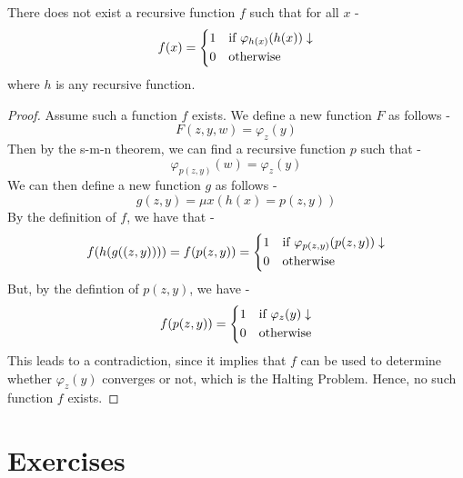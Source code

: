 \documentclass[openany]{book}
\begin{document}
\begin{mytheorem}
    There does not exist a recursive function $f$ such that for all $x$ - 
    $$f(x) = \begin{dcases}
        1 & \text{if } \varphi_{h(x)}(h(x)) \downarrow \\
        0 & \text{otherwise}
        \end{dcases}$$
    where $h$ is any recursive function.
\end{mytheorem}
\begin{proof}
    Assume such a function $f$ exists. We define a new function $F$ as follows - 
    $$F(z, y, w) = \varphi_z(y)$$
    Then by the s-m-n theorem, we can find a recursive function $p$ such that -
    $$\varphi_{p(z, y)}(w) = \varphi_z(y)$$
     We can then define a new function $g$ as follows - 
    $$g(z, y) = \mu x(h(x) = p(z, y))$$
    By the definition of $f$, we have that -
    $$f(h(g((z, y)))) = f(p(z, y)) = \begin{dcases}
        1 & \text{if } \varphi_{p(z, y)}(p(z, y)) \downarrow \\
        0 & \text{otherwise}
        \end{dcases}$$
    But, by the defintion of $p(z, y)$, we have - 
    $$f(p(z, y)) = \begin{dcases}
        1 & \text{if } \varphi_z(y) \downarrow \\
        0 & \text{otherwise}
        \end{dcases}$$
    This leads to a contradiction, since it implies that $f$ can be used to determine whether $\varphi_z(y)$ converges or not, which is the Halting Problem. Hence, no such function $f$ exists.
\end{proof}
\section{Exercises}
\end{document}

